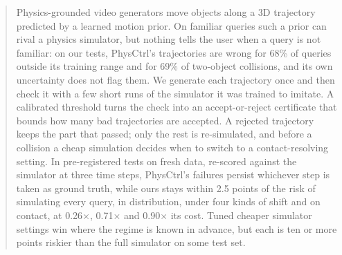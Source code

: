 \begin{abstract}
Physics-grounded video generators move objects along a 3D trajectory predicted by a learned motion prior.
On familiar queries such a prior can rival a physics simulator, but nothing tells the user when a query is not familiar: on our tests, PhysCtrl's trajectories are wrong for 68\% of queries outside its training range and for 69\% of two-object collisions, and its own uncertainty does not flag them.
We generate each trajectory once and then check it with a few short runs of the simulator it was trained to imitate.
A calibrated threshold turns the check into an accept-or-reject certificate that bounds how many bad trajectories are accepted.
A rejected trajectory keeps the part that passed; only the rest is re-simulated, and before a collision a cheap simulation decides when to switch to a contact-resolving setting.
In pre-registered tests on fresh data, re-scored against the simulator at three time steps, PhysCtrl's failures persist whichever step is taken as ground truth, while ours stays within 2.5 points of the risk of simulating every query, in distribution, under four kinds of shift and on contact, at 0.26$\times$, 0.71$\times$ and 0.90$\times$ its cost.
Tuned cheaper simulator settings win where the regime is known in advance, but each is ten or more points riskier than the full simulator on some test set.
\end{abstract}
